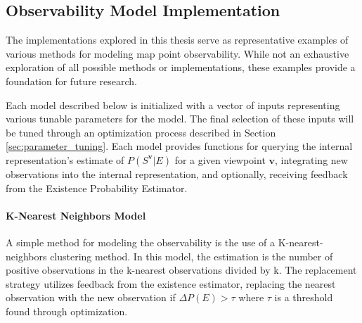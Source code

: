 \subsection{Observability Model Implementation}

The implementations explored in this thesis serve as representative examples of various methods for modeling map point observability. While not an exhaustive exploration of all possible methods or implementations, these examples provide a foundation for future research.

Each model described below is initialized with a vector of inputs representing various tunable parameters for the model. The final selection of these inputs will be tuned through an optimization process described in Section \ref{sec:parameter_tuning}. Each model provides functions for querying the internal representation's estimate of $P(S^{\boldsymbol{v}}|E)$ for a given viewpoint $\boldsymbol{v}$, integrating new observations into the internal representation, and optionally, receiving feedback from the Existence Probability Estimator.

\paragraph{K-Nearest Neighbors Model}

A simple method for modeling the observability is the use of a K-nearest-neighbors clustering method. In this model, the estimation is the number of positive observations in the k-nearest observations divided by k. The replacement strategy utilizes feedback from the existence estimator, replacing the nearest observation with the new observation if $\Delta P(E) > \tau$ where $\tau$ is a threshold found through optimization.


